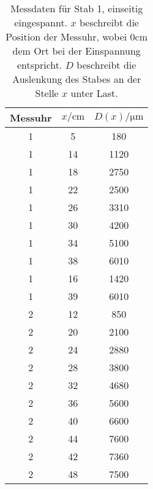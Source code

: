 \begin{table}
	\centering
	\caption{Messdaten für Stab 1, einseitig eingespannt. $x$ beschreibt
	die Position der Messuhr, wobei $0\si{\centi\meter}$
	dem Ort bei der Einspannung entspricht.
	$D$ beschreibt die Auslenkung des Stabes an der Stelle $x$ unter Last.}
	\begin{tabular}{c c c}
	\toprule
	Messuhr &
	$x / \si{\centi\meter}$ &
	$D(x) / \si{\micro\meter}$
	\\
	\midrule
	1 & 5 & 180 \\
	1 & 14 & 1120 \\
	1 & 18 & 2750 \\
	1 & 22 & 2500 \\
	1 & 26 & 3310 \\
	1 & 30 & 4200 \\
	1 & 34 & 5100 \\
	1 & 38 & 6010 \\
	1 & 16 & 1420 \\
	1 & 39 & 6010 \\
	2 & 12 & 850 \\
	2 & 20 & 2100 \\
	2 & 24 & 2880 \\
	2 & 28 & 3800 \\
	2 & 32 & 4680 \\
	2 & 36 & 5600 \\
	2 & 40 & 6600 \\
	2 & 44 & 7600 \\
	2 & 42 & 7360 \\
	2 & 48 & 7500 \\
	\bottomrule
\end{tabular}
\end{table}

